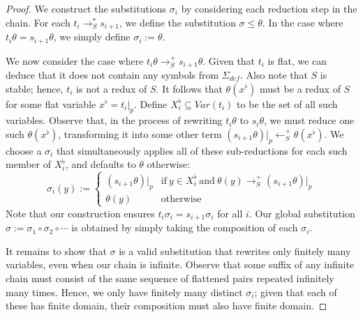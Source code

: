 \documentclass{article}
\theoremstyle{definition}
\begin{document}
\begin{proof}
    We construct the substitutions $\sigma_i$ by considering each reduction step in the chain. For each $t_i \rightarrow^*_S s_{i+1}$, we define the substitution $\sigma \leq \theta$.  In the case where $t_i\theta = s_{i+1}\theta$, we simply define $\sigma_i := \theta$. 
    
    We now consider the case where $t_i \theta \rightarrow^+_S s_{i+1} \theta$. Given that $t_i$ is flat, we can deduce that it does not contain any symbols from $\Sigma_{def}$. Also note that $S$ is stable; hence, $t_i$ is not a redux of $S$. It follows that $\theta(x^\flat)$ must be a redux of $S$ for some flat variable $x^\flat = t_i |_p$. Define $X_i^\flat \subseteq Var(t_i)$ to be the set of all such variables. Observe that, in the process of rewriting $t_i\theta$ to $s_i\theta$, we must reduce one such $\theta(x^\flat)$, transforming it into some other term $(s_{i+1} \theta)|_p \leftarrow^+_S \theta(x^\flat)$. We choose a $\sigma_i$ that simultaneously applies all of these sub-reductions for each such member of $X_i^\flat$, and defaults to $\theta$ otherwise: 
    $$\sigma_i(y) := \begin{cases}
        (s_{i+1} \theta)|_p  &\text{if}~ y \in X_i^\flat ~\text{and}~ \theta(y) \rightarrow^+_S (s_{i+1}\theta)|_p \\
        \theta(y) &\text{otherwise}
    \end{cases}$$
    Note that our construction ensures $t_i\sigma_i = s_{i+1}\sigma_i$ for all $i$. Our global substitution $\sigma := \sigma_1 \circ \sigma_2 \circ \cdots$ is obtained by simply taking the composition of each $\sigma_i$.
    
    It remains to show that $\sigma$ is a valid substitution that rewrites only finitely many variables, even when our chain is infinite. Observe that some suffix of any infinite chain must consist of the same sequence of flattened pairs repeated infinitely many times. Hence, we only have finitely many distinct $\sigma_i$; given that each of these has finite domain, their composition must also have finite domain. 
\end{proof}
\end{document}

